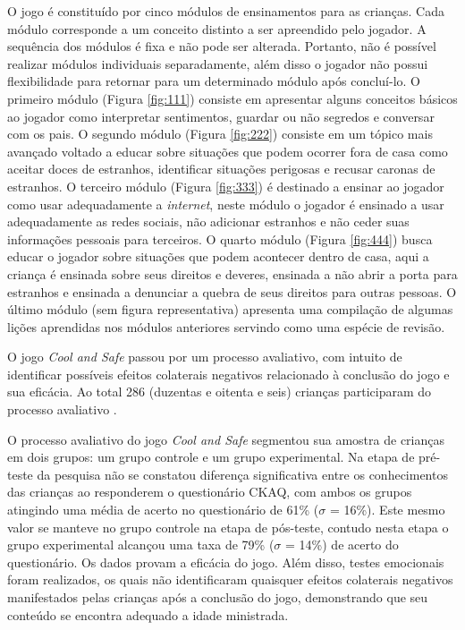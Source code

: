O jogo é constituído por cinco módulos de ensinamentos para as crianças. Cada módulo corresponde a um conceito distinto a ser apreendido pelo jogador. A sequência dos módulos é fixa e não pode ser alterada. Portanto, não é possível realizar módulos individuais separadamente, além disso o jogador não possui flexibilidade para retornar para um determinado módulo após concluí-lo. O primeiro módulo (Figura \ref{fig:111}) consiste em apresentar alguns conceitos básicos ao jogador como interpretar sentimentos, guardar ou não segredos e conversar com os pais. O segundo módulo (Figura \ref{fig:222}) consiste em um tópico mais avançado voltado a educar sobre situações que podem ocorrer fora de casa como aceitar doces de estranhos, identificar situações perigosas e recusar caronas de estranhos. O terceiro módulo (Figura \ref{fig:333}) é destinado a ensinar ao jogador como usar adequadamente a \textit{internet}, neste módulo o jogador é ensinado a usar adequadamente as redes sociais, não adicionar estranhos e não ceder suas informações pessoais para terceiros. O quarto módulo (Figura \ref{fig:444}) busca educar o jogador sobre situações que podem acontecer dentro de casa, aqui a criança é ensinada sobre seus direitos e deveres, ensinada a não abrir a porta para estranhos e ensinada a denunciar a quebra de seus direitos para outras pessoas. O último módulo (sem figura representativa) apresenta uma compilação de algumas lições aprendidas nos módulos anteriores servindo como uma espécie de revisão. 

O jogo \textit{Cool and Safe} passou por um processo avaliativo, com intuito de identificar possíveis efeitos colaterais negativos relacionado à conclusão do jogo e sua eficácia. Ao total 286 (duzentas e oitenta e seis) crianças participaram do processo avaliativo \cite{muller2014child}. 

O processo avaliativo do jogo \textit{Cool and Safe} segmentou sua amostra de crianças em dois grupos: um grupo controle e um grupo experimental. Na etapa de pré-teste da pesquisa não se constatou diferença significativa entre os conhecimentos das crianças ao responderem o questionário \ac{CKAQ}, com ambos os grupos atingindo uma média de acerto no questionário de 61\% ($\sigma$ = 16\%). Este mesmo valor se manteve no grupo controle na etapa de pós-teste, contudo nesta etapa o grupo experimental alcançou uma taxa de 79\%  ($\sigma$ = 14\%) de acerto do questionário. Os dados provam a eficácia do jogo. Além disso, testes emocionais foram realizados, os quais não identificaram quaisquer efeitos colaterais negativos manifestados pelas crianças após a conclusão do jogo, demonstrando que seu conteúdo se encontra adequado a idade ministrada. 


